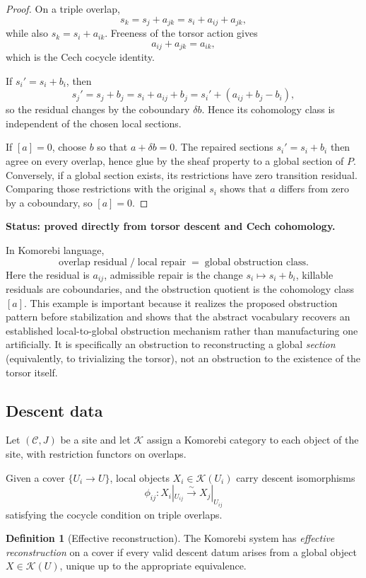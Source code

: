 \documentclass[11pt]{article}
\theoremstyle{definition}
\newtheorem{definition}[theorem]{Definition}
\theoremstyle{remark}
\newcommand{\status}[1]{\textbf{Status: #1.}}
\begin{document}
\begin{proof}
On a triple overlap,
\[
s_k=s_j+a_{jk}=s_i+a_{ij}+a_{jk},
\]
while also $s_k=s_i+a_{ik}$. Freeness of the torsor action gives
\[
a_{ij}+a_{jk}=a_{ik},
\]
which is the Cech cocycle identity.

If $s_i'=s_i+b_i$, then
\[
s_j'=s_j+b_j=s_i+a_{ij}+b_j
=s_i'+(a_{ij}+b_j-b_i),
\]
so the residual changes by the coboundary $\delta b$. Hence its cohomology class is independent of the chosen local sections.

If $[a]=0$, choose $b$ so that $a+\delta b=0$. The repaired sections $s_i'=s_i+b_i$ then agree on every overlap, hence glue by the sheaf property to a global section of $P$. Conversely, if a global section exists, its restrictions have zero transition residual. Comparing those restrictions with the original $s_i$ shows that $a$ differs from zero by a coboundary, so $[a]=0$.
\end{proof}

\status{proved directly from torsor descent and Cech cohomology}

In Komorebi language,
\[
\boxed{
\text{overlap residual}
\;/\;
\text{local repair}
\;=\;
\text{global obstruction class}.}
\]
Here the residual is $a_{ij}$, admissible repair is the change $s_i\mapsto s_i+b_i$, killable residuals are coboundaries, and the obstruction quotient is the cohomology class $[a]$. This example is important because it realizes the proposed obstruction pattern before stabilization and shows that the abstract vocabulary recovers an established local-to-global obstruction mechanism rather than manufacturing one artificially.
It is specifically an obstruction to reconstructing a global \emph{section} (equivalently, to trivializing the torsor), not an obstruction to the existence of the torsor itself.

\subsection{Descent data}

Let $(\mathcal C,J)$ be a site and let $\mathscr K$ assign a Komorebi category to each object of the site, with restriction functors on overlaps.

Given a cover $\{U_i\to U\}$, local objects $X_i\in\mathscr K(U_i)$ carry descent isomorphisms
\[
\phi_{ij}:X_i|_{U_{ij}}\xrightarrow{\sim}X_j|_{U_{ij}}
\]
satisfying the cocycle condition on triple overlaps.

\begin{definition}[Effective reconstruction]
The Komorebi system has \emph{effective reconstruction} on a cover if every valid descent datum arises from a global object $X\in\mathscr K(U)$, unique up to the appropriate equivalence.
\end{definition}
\end{document}
